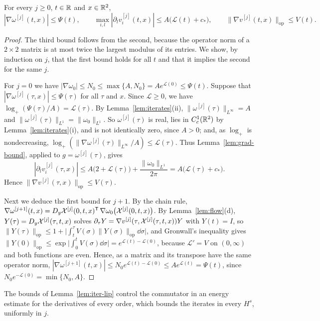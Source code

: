 \begin{lemma}
\label{lem:iter-lip}
For every $j\ge0$, $t\in\mathbb{R}$ and $x\in\mathbb{R}^2$,
\[
|\nabla\omega^{[j]}(t,x)|\le\Psi(t),\qquad
\max_{i,l}|\partial_lv^{[j]}_i(t,x)|\le A\big(\mathcal L(t)+c_*\big),\qquad
\|\nabla v^{[j]}(t,x)\|_{\mathrm{op}}\le V(t).
\]
\end{lemma}

\begin{proof}
The third bound follows from the second, because the operator norm of a
$2\times2$ matrix is at most twice the largest modulus of its entries. We show,
by induction on $j$, that the first bound holds for all $t$ and that it implies
the second for the same $j$.

For $j=0$ we have
$|\nabla\omega_0|\le N_0\le\max\{A,N_0\}=Ae^{\mathcal L(0)}\le\Psi(t)$. Suppose
that $|\nabla\omega^{[j]}(\tau,x)|\le\Psi(\tau)$ for all $\tau$ and $x$. Since
$\mathcal L\ge0$, we have $\log_+(\Psi(\tau)/A)=\mathcal L(\tau)$. By
Lemma~\ref{lem:iterates}(ii), $\|\omega^{[j]}(\tau)\|_{L^\infty}=A$ and
$\|\omega^{[j]}(\tau)\|_{L^1}=\|\omega_0\|_{L^1}$. So $\omega^{[j]}(\tau)$ is real,
lies in $C^1_c(\mathbb{R}^2)$ by Lemma~\ref{lem:iterates}(i), and is not identically
zero, since $A>0$; and, as $\log_+$ is nondecreasing,
$\log_+(\|\nabla\omega^{[j]}(\tau)\|_{L^\infty}/A)\le\mathcal L(\tau)$. Thus Lemma~\ref{lem:grad-bound},
applied to $g=\omega^{[j]}(\tau)$, gives
\[
|\partial_lv^{[j]}_i(\tau,x)|\le A\big(2+\mathcal L(\tau)\big)+\frac{\|\omega_0\|_{L^1}}{2\pi}=A\big(\mathcal L(\tau)+c_*\big).
\]
Hence $\|\nabla v^{[j]}(\tau,x)\|_{\mathrm{op}}\le V(\tau)$.

Next we deduce the first bound for $j+1$. By the chain rule,
$\nabla\omega^{[j+1]}(t,x)=D_y\mathcal{X}^{[j]}(0,t,x)^{\mathsf T}\,\nabla\omega_0\big(\mathcal{X}^{[j]}(0,t,x)\big)$.
By Lemma~\ref{lem:flow}(d), $Y(\tau)=D_y\mathcal{X}^{[j]}(\tau,t,x)$ solves
$\partial_\tau Y=\nabla v^{[j]}(\tau,\mathcal{X}^{[j]}(\tau,t,x))Y$ with $Y(t)=I$, so
$\|Y(\tau)\|_{\mathrm{op}}\le1+\big|\int_t^\tau V(\sigma)\|Y(\sigma)\|_{\mathrm{op}}\dd\sigma\big|$,
and Gronwall's inequality gives
$\|Y(0)\|_{\mathrm{op}}\le\exp\big|\int_0^tV(\sigma)\dd\sigma\big|=e^{\mathcal L(t)-\mathcal L(0)}$,
because $\mathcal L'=V$ on $(0,\infty)$ and both functions are even. Hence,
as a matrix and its transpose have the same operator norm,
$|\nabla\omega^{[j+1]}(t,x)|\le N_0e^{\mathcal L(t)-\mathcal L(0)}\le Ae^{\mathcal L(t)}=\Psi(t)$,
since $N_0e^{-\mathcal L(0)}=\min\{N_0,A\}$.
\end{proof}

The bounds of Lemma~\ref{lem:iter-lip} control the commutator in an energy
estimate for the derivatives of every order, which bounds the iterates in every
$H^s$, uniformly in $j$.


